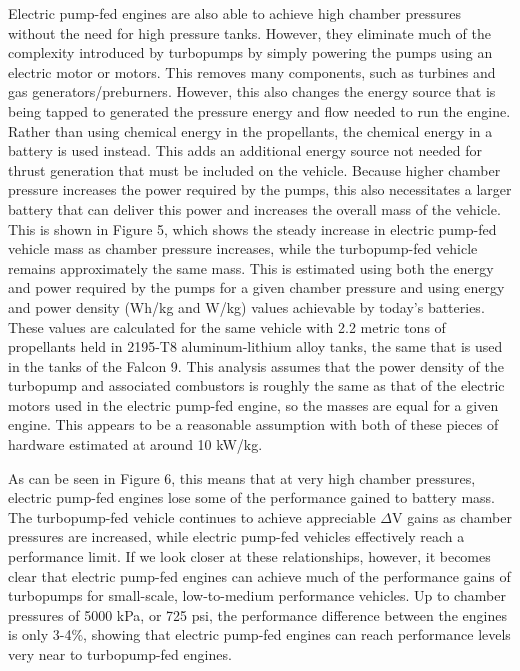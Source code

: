 \documentclass[12pt, letterpaper]{article}
\begin{document}
Electric pump-fed engines are also able to achieve high chamber pressures without the need for high pressure tanks. However, they eliminate much of the complexity introduced by turbopumps by simply powering the pumps using an electric motor or motors. This removes many components, such as turbines and gas generators/preburners. However, this also changes the energy source that is being tapped to generated the pressure energy and flow needed to run the engine. Rather than using chemical energy in the propellants, the chemical energy in a battery is used instead. This adds an additional energy source not needed for thrust generation that must be included on the vehicle. Because higher chamber pressure increases the power required by the pumps, this also necessitates a larger battery that can deliver this power and increases the overall mass of the vehicle. This is shown in Figure 5, which shows the steady increase in electric pump-fed vehicle mass as chamber pressure increases, while the turbopump-fed vehicle remains approximately the same mass. This is estimated using both the energy and power required by the pumps for a given chamber pressure and using energy and power density (Wh/kg and W/kg) values achievable by today's batteries. These values are calculated for the same vehicle with 2.2 metric tons of propellants held in 2195-T8 aluminum-lithium alloy tanks, the same that is used in the tanks of the Falcon 9. This analysis assumes that the power density of the turbopump and associated combustors is roughly the same as that of the electric motors used in the electric pump-fed engine, so the masses are equal for a given engine. This appears to be a reasonable assumption with both of these pieces of hardware estimated at around 10 kW/kg. 

As can be seen in Figure 6, this means that at very high chamber pressures, electric pump-fed engines lose some of the performance gained to battery mass.  The turbopump-fed vehicle continues to achieve appreciable $\Delta $V gains as chamber pressures are increased, while electric pump-fed vehicles effectively reach a performance limit. If we look closer at these relationships, however, it becomes clear that electric pump-fed engines can achieve much of the performance gains of turbopumps for  small-scale, low-to-medium performance vehicles. Up to chamber pressures of 5000 kPa, or 725 psi, the performance difference between the engines is only 3-4\%, showing that electric pump-fed engines can reach performance levels very near to turbopump-fed engines.
\end{document}
